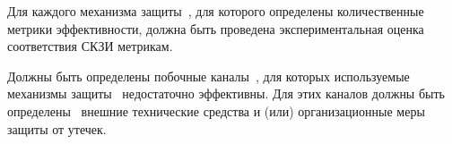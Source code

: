 
\label{R.NI.Estimate} %
Для каждого механизма защиты~, для которого 
определены количественные метрики эффективности, должна быть проведена 
экспериментальная оценка соответствия СКЗИ метрикам.


\label{R.NI.External} %
Должны быть определены побочные каналы~,
для которых используемые механизмы защиты~
недостаточно эффективны. Для этих каналов должны быть 
определены~ внешние технические 
средства и (или) организационные меры защиты от утечек. 


